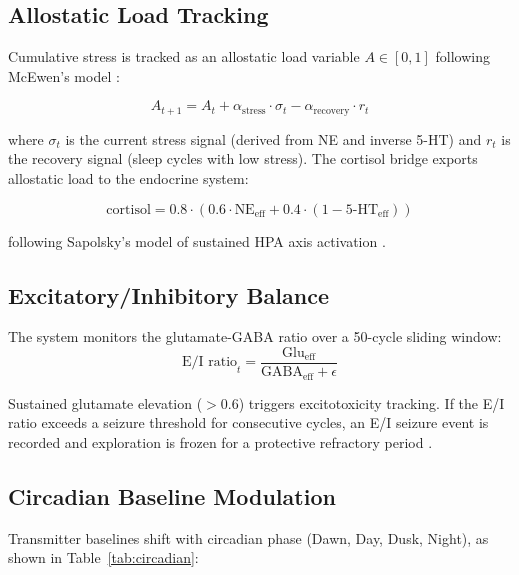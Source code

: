 \documentclass[11pt,a4paper]{article}
\begin{document}
\subsection{Allostatic Load Tracking}

Cumulative stress is tracked as an allostatic load variable $A \in [0, 1]$ following McEwen's model \citep{mcewen1998}:

\begin{equation}
A_{t+1} = A_t + \alpha_{\text{stress}} \cdot \sigma_t - \alpha_{\text{recovery}} \cdot r_t
\end{equation}

\noindent where $\sigma_t$ is the current stress signal (derived from NE and inverse 5-HT) and $r_t$ is the recovery signal (sleep cycles with low stress). The cortisol bridge exports allostatic load to the endocrine system:

\begin{equation}
\text{cortisol} = 0.8 \cdot (0.6 \cdot \text{NE}_{\text{eff}} + 0.4 \cdot (1 - \text{5-HT}_{\text{eff}}))
\end{equation}

\noindent following Sapolsky's model of sustained HPA axis activation \citep{sapolsky2004}.

\subsection{Excitatory/Inhibitory Balance}

The system monitors the glutamate-GABA ratio over a 50-cycle sliding window:
\begin{equation}
\text{E/I ratio}_t = \frac{\text{Glu}_{\text{eff}}}{\text{GABA}_{\text{eff}} + \epsilon}
\end{equation}

Sustained glutamate elevation ($> 0.6$) triggers excitotoxicity tracking. If the E/I ratio exceeds a seizure threshold for consecutive cycles, an E/I seizure event is recorded and exploration is frozen for a protective refractory period \citep{bhatt2009, turrigiano2012}.

\subsection{Circadian Baseline Modulation}

Transmitter baselines shift with circadian phase (Dawn, Day, Dusk, Night), as shown in Table~\ref{tab:circadian}:
\end{document}
